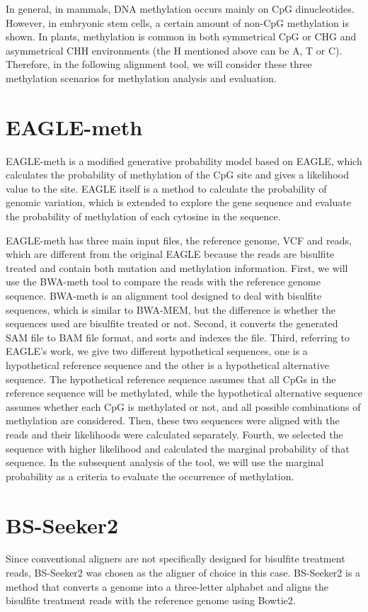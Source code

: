 \documentclass{PHlab-thesis}
\begin{document}
In general, in mammals, DNA methylation occurs mainly on CpG dinucleotides. However, in embryonic stem cells, a certain amount of non-CpG methylation is shown. In plants, methylation is common in both symmetrical CpG or CHG and asymmetrical CHH environments (the H mentioned above can be A, T or C). Therefore, in the following alignment tool, we will consider these three methylation scenarios for methylation analysis and evaluation.

\section{EAGLE-meth}
EAGLE-meth is a modified generative probability model based on EAGLE\cite{kuo2018eagle}, which calculates the probability of methylation of the CpG site and gives a likelihood value to the site. EAGLE itself is a method to calculate the probability of genomic variation, which is extended to explore the gene sequence and evaluate the probability of methylation of each cytosine in the sequence.

EAGLE-meth has three main input files, the reference genome, VCF and reads, which are different from the original EAGLE because the reads are bisulfite treated and contain both mutation and methylation information. First, we will use the BWA-meth tool to compare the reads with the reference genome sequence.  BWA-meth is an alignment tool designed to deal with bisulfite sequences, which is similar to BWA-MEM, but the difference is whether the sequences used are bisulfite treated or not.  Second, it converts the generated SAM file to BAM file format, and sorts and indexes the file.  Third, referring to EAGLE's work, we give two different hypothetical sequences, one is a hypothetical reference sequence and the other is a hypothetical alternative sequence. The hypothetical reference sequence assumes that all CpGs in the reference sequence will be methylated, while the hypothetical alternative sequence assumes whether each CpG is methylated or not, and all possible combinations of methylation are considered.  Then, these two sequences were aligned with the reads and their likelihoods were calculated separately.  Fourth, we selected the sequence with higher likelihood and calculated the marginal probability of that sequence. In the subsequent analysis of the tool, we will use the marginal probability as a criteria to evaluate the occurrence of methylation.

\section{BS-Seeker2}
Since conventional aligners are not specifically designed for bisulfite treatment reads, BS-Seeker2 was chosen as the aligner of choice in this case.  BS-Seeker2 is a method that converts a genome into a three-letter alphabet and aligns the bisulfite treatment reads with the reference genome using Bowtie2.
\end{document}
